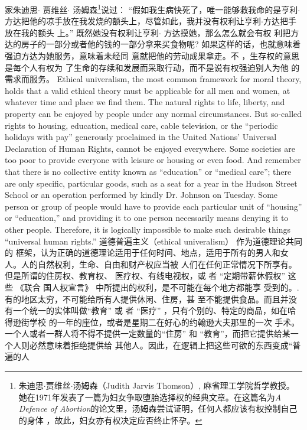 \begin{paracol}{2}
家朱迪思$\cdot$ 贾维丝$\cdot$ 汤姆森\footnote{朱迪思$\cdot$贾维丝$\cdot$汤姆森（Judith  Jarvis Thomson）, 麻省理工学院哲学教授。她在1971年发表了一篇为妇女争取堕胎选择权的经典文章。在这篇名为\textit{A Defence of Abortion}的论文里，汤姆森尝试证明，任何人都应该有权控制自己的身体 ，故此，妇女亦有权决定应否终止怀孕。}说过： “假如我生病快死了，唯一能够救我命的是亨利$\cdot$方达把他的凉手放在我发烧的额头上，尽管如此，我并没有权利让亨利$\cdot$方达把手放在我的额头
上。” 既然她没有权利让亨利$\cdot$ 方达摸她，那么怎么就会有权
利把方达的房子的一部分或者他的钱的一部分拿来买食物呢?
如果这样的话，也就意味着强迫方达为她服务，意味着未经同
意就把他的劳动成果拿走。不 ，生存权的意思是每个人有权为
了生命的存续和发展而采取行动，而不是说有权强迫别人为他
的需求而服务。
\switchcolumn*
Ethical univeralism, the most common framework for moral
theory, holds that a valid ethical theory must be applicable for
all men and women, at whatever time and place we find them.
The natural rights to life, liberty, and property can be enjoyed
by people under any normal circumstances. But so-called rights
to housing, education, medical care, cable television, or the ``periodic holidays with pay'' generously proclaimed in the United
Nations' Universal Declaration of Human Rights, cannot be
enjoyed everywhere. Some societies are too poor to provide
everyone with leisure or housing or even food. And remember
that there is no collective entity known as ``education'' or ``medical care''; there are only specific, particular goods, such as a seat
for a year in the Hudson Street School or an operation performed by kindly Dr. Johnson on Tuesday. Some person or
group of people would have to provide each particular unit of
``housing'' or ``education,'' and providing it to one person necessarily means denying it to other people. Therefore, it is logically
impossible to make such desirable things ``universal human
rights.''
\switchcolumn
道德普遍主义（ethical univeralism） 作为道德理论共同的
框架，认为正确的道德理论适用于任何时间、地点，适用于所有的男人和女人。人的自然权利，生命、自由和财产权应当被
人们在任何正常情况下所享有。但是所谓的住房权、教育权、
医疗权、有线电视权，或 者 “定期带薪休假权” 这 些 《联合
国人权宣言》 中所提出的权利，是不可能在每个地方都能享
受到的。.有的地区太穷，不可能给所有人提供休闲、住房，甚
至不能提供食品。而且并没有一个统一的实体叫做“教育”
或 者 “医疗” ，只有个别的、特定的商品，如在哈得逊街学校
的一年的座位，或者是星期二在好心的约翰逊大夫那里的一次
手术。一个人或者一群人将不得不提供一定数量的“住房”
和 “教育”，而把它提供给某一个人则必然意味着拒绝提供给
其他人。因此，在逻辑上把这些可欲的东西变成“普遍的人

\end{paracol}
